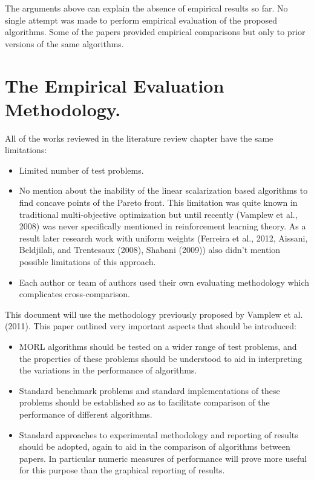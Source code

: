 The arguments above can explain the absence of empirical results so far. No single attempt was made to perform empirical evaluation of the proposed algorithms. Some of the papers provided empirical comparisons but only to prior versions of the same algorithms.

\section{The Empirical Evaluation Methodology.}

All of the works reviewed in the literature review chapter have the same limitations:
\begin{itemize}
  \item Limited number of test problems.
  \item No mention about the inability of the linear scalarization based algorithms to find concave points of the Pareto front. This limitation was quite known in traditional multi-objective optimization but until recently (Vamplew et al., 2008\nocite{vamplew2008limitations}) was never specifically mentioned in reinforcement learning theory. As a result later research work with uniform weights (Ferreira et al., 2012\nocite{F6363312}, Aissani, Beldjilali, and Trentesaux (2008)\nocite{aissani2008use}, Shabani (2009)\nocite{shabani2009incorporating}) also didn't mention possible limitations of this approach.
  \item Each author or team of authors used their own evaluating methodology which complicates cross-comparison.
\end{itemize}

This document will use the methodology previously proposed by Vamplew et al. (2011)\nocite{vamplew2011empirical}. This paper outlined very important aspects that should be introduced:
\begin{itemize}
  \item MORL algorithms should be tested on a wider range of test problems, and the properties of these problems should be understood to aid in interpreting the variations in the performance of algorithms.
  \item Standard benchmark problems and standard implementations of these problems should be established so as to facilitate comparison of the performance of different algorithms.
  \item Standard approaches to experimental methodology and reporting of results should be adopted, again to aid in the comparison of algorithms between papers. In particular numeric measures of performance will prove more useful for this purpose than the graphical reporting of results.
\end{itemize}

